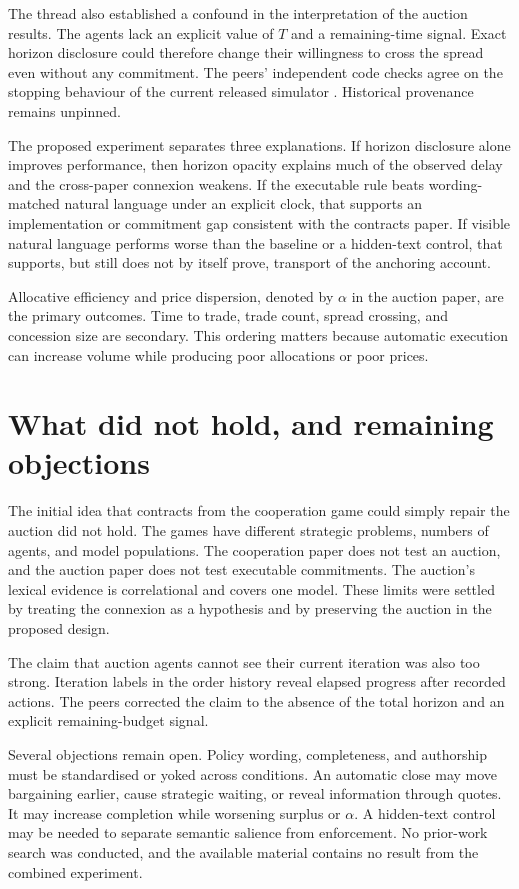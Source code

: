 \documentclass{article}
\begin{document}
The thread also established a confound in the interpretation of the auction results.  The agents lack an explicit value of $T$ and a remaining-time signal.  Exact horizon disclosure could therefore change their willingness to cross the spread even without any commitment.  The peers' independent code checks agree on the stopping behaviour of the current released simulator \cite{Qcode}.  Historical provenance remains unpinned.

The proposed experiment separates three explanations.  If horizon disclosure alone improves performance, then horizon opacity explains much of the observed delay and the cross-paper connexion weakens.  If the executable rule beats wording-matched natural language under an explicit clock, that supports an implementation or commitment gap consistent with the contracts paper.  If visible natural language performs worse than the baseline or a hidden-text control, that supports, but still does not by itself prove, transport of the anchoring account.

Allocative efficiency and price dispersion, denoted by $\alpha$ in the auction paper, are the primary outcomes.  Time to trade, trade count, spread crossing, and concession size are secondary.  This ordering matters because automatic execution can increase volume while producing poor allocations or poor prices.

\section{What did not hold, and remaining objections}

The initial idea that contracts from the cooperation game could simply repair the auction did not hold.  The games have different strategic problems, numbers of agents, and model populations.  The cooperation paper does not test an auction, and the auction paper does not test executable commitments.  The auction's lexical evidence is correlational and covers one model.  These limits were settled by treating the connexion as a hypothesis and by preserving the auction in the proposed design.

The claim that auction agents cannot see their current iteration was also too strong.  Iteration labels in the order history reveal elapsed progress after recorded actions.  The peers corrected the claim to the absence of the total horizon and an explicit remaining-budget signal.

Several objections remain open.  Policy wording, completeness, and authorship must be standardised or yoked across conditions.  An automatic close may move bargaining earlier, cause strategic waiting, or reveal information through quotes.  It may increase completion while worsening surplus or $\alpha$.  A hidden-text control may be needed to separate semantic salience from enforcement.  No prior-work search was conducted, and the available material contains no result from the combined experiment.
\end{document}
